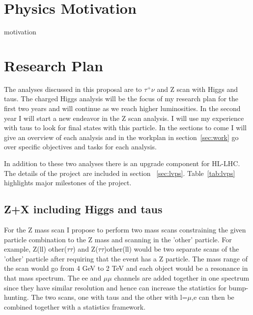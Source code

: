\section{Physics Motivation}
\label{sec:mot}
 {motivation} 
\section{Research Plan}
\label{sec:anal}
The analyses discussed in this proposal are \Hp to $\tau^+ \nu$ and Z scan with Higgs and taus.  The charged Higgs analysis will be the focus of my research plan for the first two years and will continue as we reach 
higher luminosities.  In the second year I will start a new endeavor in the Z scan analysis.  I will use my experience with taus to look for final states with this particle.  
In the sections to come I will give an overview of each analysis and in the workplan in section~\ref{sec:work} go over specific objectives and tasks for each analysis.

In addition to these two analyses there is an upgrade component for HL-LHC.  The details of the project are included in section ~\ref{sec:lvps}. Table~\ref{tab:lvps} highlights major milestones of the project.

\subsection{Z+X including Higgs and taus}
For the Z mass scan I propose to perform two mass scans constraining the given particle combination to the Z mass and scanning in the 'other' particle. 
For example, Z(ll) other($\tau\tau$) and Z($\tau\tau$)other(ll) would be two separate scans of the 'other' particle after requiring that the event has a Z particle. 
The mass range of the scan would go from 4 GeV to 2 TeV and each object would be a resonance in that mass spectrum. The ee and $\mu\mu$ channels are added together 
in one spectrum since they have similar resolution and hence can increase the statistics for bump-hunting.  
The two scans, one with taus and the other with l=$\mu$,e  can then be combined together with a statistics framework.  

